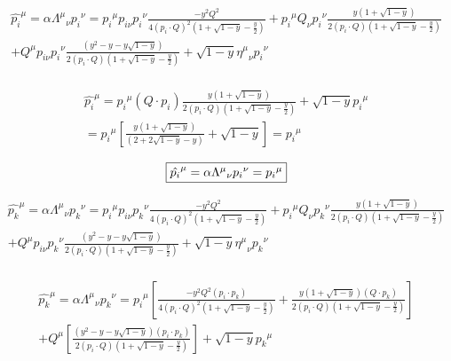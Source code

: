 \begin{equation}
	\begin{aligned}
	{\hat{{p_i}}}^{\mu}=\alpha{\Lambda^{\mu}}_{\nu} {p_i}^{\nu}= {p_i}^{\mu} p_{i\nu}{p_i}^{\nu} \frac{-y^2 Q^2}{4(p_i\cdot Q)^2(1+\sqrt{1-y}-\frac{y}{2})}
	+{p_i}^{\mu} Q_{\nu}{p_i}^{\nu} \frac{y(1+\sqrt{1-y})}{2(p_i\cdot Q)(1+\sqrt{1-y}-\frac{y}{2})}\\
	+{Q}^{\mu} p_{i\nu}{p_i}^{\nu} \frac{(y^2 -y-y\sqrt{1-y})}{2(p_i\cdot Q)(1+\sqrt{1-y}-\frac{y}{2})}+\sqrt{1-y} {\eta^{\mu}}_{\nu}{p_i}^{\nu}\\
    \end{aligned}
\end{equation}

\begin{equation}
	\begin{aligned}
	{\hat{{p_i}}}^{\mu}={p_i}^{\mu} (Q\cdot p_i) \frac{y(1+\sqrt{1-y})}{2(p_i\cdot Q)(1+\sqrt{1-y}-\frac{y}{2})}+\sqrt{1-y} {p_i}^{\mu}\\
	={p_i}^{\mu} [ \frac{y(1+\sqrt{1-y})}{(2+2\sqrt{1-y}-y)}+\sqrt{1-y}]={p_i}^{\mu}
    \end{aligned}
\end{equation}

\begin{equation}
	\begin{aligned}
		\fbox{$  {\hat{{p_i}}}^{\mu}=\alpha{\Lambda^{\mu}}_{\nu} {p_i}^{\nu}= {p_i}^{\mu}$}
    \end{aligned}
\end{equation}

\begin{equation}
	\begin{aligned}
	{\hat{{p_k}}}^{\mu}=\alpha{\Lambda^{\mu}}_{\nu} {p_k}^{\nu}= {p_i}^{\mu} p_{i\nu}{p_k}^{\nu} \frac{-y^2 Q^2}{4(p_i\cdot Q)^2(1+\sqrt{1-y}-\frac{y}{2})}
	+{p_i}^{\mu} Q_{\nu}{p_k}^{\nu} \frac{y(1+\sqrt{1-y})}{2(p_i\cdot Q)(1+\sqrt{1-y}-\frac{y}{2})}\\
	+{Q}^{\mu} p_{i\nu}{p_k}^{\nu} \frac{(y^2 -y-y\sqrt{1-y})}{2(p_i\cdot Q)(1+\sqrt{1-y}-\frac{y}{2})}+\sqrt{1-y} {\eta^{\mu}}_{\nu}{p_k}^{\nu}\\
    \end{aligned}
\end{equation}

\begin{equation}
	\begin{aligned}
	{\hat{{p_k}}}^{\mu}=\alpha{\Lambda^{\mu}}_{\nu} {p_k}^{\nu}= {p_i}^{\mu}[  \frac{-y^2 Q^2 (p_{i}\cdot {p_k})}{4(p_i\cdot Q)^2(1+\sqrt{1-y}-\frac{y}{2})}+ \frac{y(1+\sqrt{1-y})(Q \cdot {p_k})}{2(p_i\cdot Q)(1+\sqrt{1-y}-\frac{y}{2})}]\\
	+{Q}^{\mu} [ \frac{(y^2 -y-y\sqrt{1-y}) (p_{i}\cdot {p_k})}{2(p_i\cdot Q)(1+\sqrt{1-y}-\frac{y}{2})}]
	+\sqrt{1-y} {p_k}^{\mu}\\
    \end{aligned}
\end{equation}



